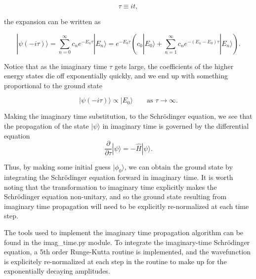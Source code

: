 \documentclass[11pt]{article}
\begin{document}
\begin{equation} 
\tau \equiv i t,
\end{equation}

the expansion can be written as

\begin{equation*}
| \psi \left( -i \tau\right) \rangle = \sum_{n=0}^\infty c_n e^{- E_n \tau} | E_n \rangle = e^{- E_0 \tau}\left(c_0 | E_0 \rangle + \sum_{n=1}^\infty  c_n e^{- \left(E_n-E_0\right) \tau} | E_n \rangle \right).
\end{equation*}

Notice that as the imaginary time \(\tau\) gets large, the coefficients
of the higher energy states die off exponentially quickly, and we end up
with something proportional to the ground state

\begin{equation*}
| \psi \left( -i \tau \right) \rangle \propto | E_0 \rangle \qquad \text{as $\tau \to \infty$}.
\end{equation*}

Making the imaginary time substitution, to the Schrödinger equation, we
see that the propagation of the state \(|\psi \rangle\) in imaginary
time is governed by the differential equation
\begin{equation}\label{eqn:SchrodingerTau}
\frac{\partial}{\partial \tau} |\psi \rangle = -\hat H |\psi \rangle.
\end{equation}

Thus, by making some initial guess \(| \phi_0 \rangle\), we can obtain
the ground state by integrating the Schrödinger equation forward in
imaginary time. It is worth noting that the transformation to imaginary
time explicitly makes the Schrödinger equation non-unitary, and so the
ground state resulting from imaginary time propagation will need to be
explicitly re-normalized at each time step.

The tools used to implement the imaginary time propagation algorithm can
be found in the imag\_time.py module. To integrate the imaginary-time
Schrödinger equation, a 5th order Runge-Kutta routine is implemented,
and the wavefunction is explicitely re-normalized at each step in the
routine to make up for the exponentially decaying amplitudes.
\end{document}
